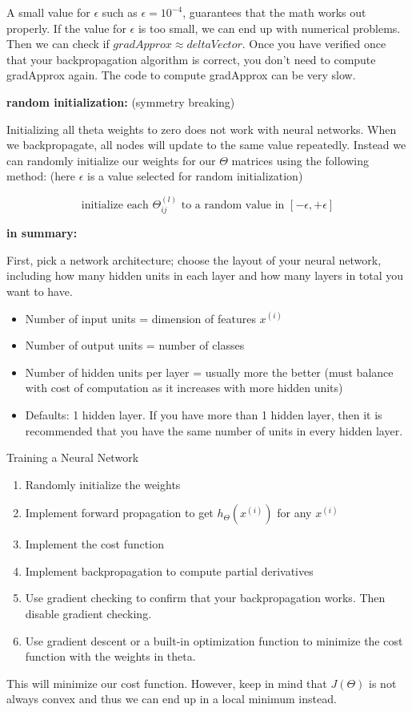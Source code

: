 \documentclass{article}
\begin{document}
\noindent A small value for \(\epsilon\) such as \(\epsilon = 10^{-4}\), guarantees that the math works out properly. If the value for \(\epsilon\) is too small, we can end up with numerical problems. Then we can check if \(gradApprox \approx deltaVector\). Once you have verified once that your backpropagation algorithm is correct, you don't need to compute gradApprox again. The code to compute gradApprox can be very slow.
 
\bigskip

\noindent \textbf{random initialization:} (symmetry breaking)

\noindent Initializing all theta weights to zero does not work with neural networks. When we backpropagate, all nodes will update to the same value repeatedly. Instead we can randomly initialize our weights for our \(\Theta\) matrices using the following method: (here \(\epsilon\) is a value selected for random initialization)

\[\text{initialize each } \Theta_{ij}^{(l)} \text{ to a random value in } [-\epsilon, +\epsilon]\]

\noindent \textbf{in summary:}

\noindent First, pick a network architecture; choose the layout of your neural network, including how many hidden units in each layer and how many layers in total you want to have.

\begin{itemize}
  \item Number of input units = dimension of features \(x^{(i)}\)
  \item Number of output units = number of classes
  \item Number of hidden units per layer = usually more the better (must balance with cost of computation as it increases with more hidden units)
  \item Defaults: 1 hidden layer. If you have more than 1 hidden layer, then it is recommended that you have the same number of units in every hidden layer.
\end{itemize}

\noindent Training a Neural Network

\begin{enumerate}
  \item Randomly initialize the weights
  \item Implement forward propagation to get \(h_\Theta(x^{(i)})\) for any \(x^{(i)}\)
  \item Implement the cost function
  \item Implement backpropagation to compute partial derivatives
  \item Use gradient checking to confirm that your backpropagation works. Then disable gradient checking.
  \item Use gradient descent or a built-in optimization function to minimize the cost function with the weights in theta.
\end{enumerate}

\noindent This will minimize our cost function. However, keep in mind that \(J(\Theta)\) is not always convex and thus we can end up in a local minimum instead. 

\printindex
\end{document}
